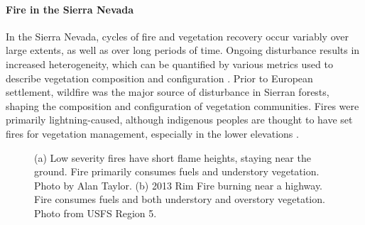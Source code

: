 \paragraph{Fire in the Sierra Nevada}
In the Sierra Nevada, cycles of fire and vegetation recovery occur variably over large extents, as well as over long periods of time. Ongoing disturbance results in increased heterogeneity, which can be quantified by various metrics used to describe vegetation composition and configuration \citep{Monica2008}. Prior to European settlement, wildfire was the major source of disturbance in Sierran forests, shaping the composition and configuration of vegetation communities. Fires were primarily lightning-caused, although indigenous peoples are thought to have set fires for vegetation management, especially in the lower elevations \citep{Safford2013}. 

\begin{figure}[!htbp]
  \centering
   \caption{(a) Low severity fires have short flame heights, staying near the ground. Fire primarily consumes fuels and understory vegetation. Photo by Alan Taylor. (b) 2013 Rim Fire burning near a highway. Fire consumes fuels and both understory and overstory vegetation. Photo from USFS Region 5.} 
\label{figs:fireseverity}
\end{figure}

